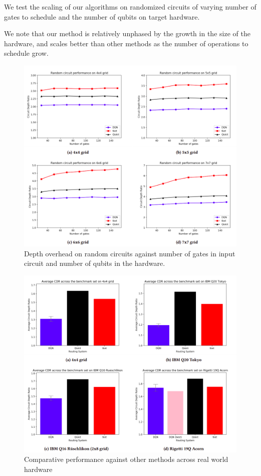 \documentclass[%
 reprint,
 amsmath,amssymb,
 aps,
]{revtex4-2}
\begin{document}
We test the scaling of our algorithms on randomized circuits of varying number of gates to schedule and the number of qubits on target hardware.

We note that our method is relatively unphased by the growth in the size of the hardware, and scales better than other methods as the number of operations to schedule grow.

\begin{figure}[H]
    \includegraphics[width=0.8\linewidth]{images/results-random.png}
    \caption{\label{fig:results-random}
        Depth overhead on random circuits against number of gates in input circuit and number of qubits in the hardware.}
\end{figure}

\begin{figure}[H]
    \includegraphics[width=0.8\linewidth]{images/results-hardwares.png}
    \caption{\label{fig:results-hardware}
        Comparative performance against other methods across real world hardware}
\end{figure}
\end{document}
